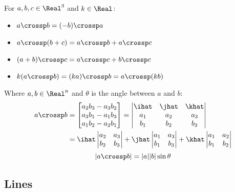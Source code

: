 \begin{theorem}
  For $a, b, c \in \Real^3$ and $k \in \Real$:
  \begin{itemize}
    \item $a \crossp b = (-b) \crossp a$
    \item $a \crossp (b + c) = a \crossp b + a \crossp c$
    \item $(a + b) \crossp c = a \crossp c + b \crossp c$
    \item $k(a \crossp b) = (ka) \crossp b = a \crossp (kb)$
  \end{itemize}
\end{theorem}

\begin{theorem}
  Where $a, b \in \Real^n$ and $\theta$ is the angle between $a$ and $b$:
  \begin{align*}
    a \crossp b &= \begin{bmatrix}
      a_2 b_3 - a_3 b_2 \\
      a_3 b_1 - a_1 b_3 \\
      a_1 b_2 - a_2 b_1 \\
    \end{bmatrix} = \begin{vmatrix}
      \ihat & \jhat & \khat \\
      a_1 & a_2 & a_3 \\
      b_1 & b_2 & b_3
    \end{vmatrix} \\
    &= \ihat \begin{vmatrix}
      a_2 & a_3 \\
      b_2 & b_3
    \end{vmatrix}
    + \jhat \begin{vmatrix}
      a_1 & a_3 \\
      b_1 & b_3
    \end{vmatrix}
    + \khat \begin{vmatrix}
      a_1 & a_2 \\
      b_1 & b_2
    \end{vmatrix}
  \end{align*}
  \[
    |a \crossp b| = |a| |b| \sin \theta
  \]
\end{theorem}

\subsection{Lines}

